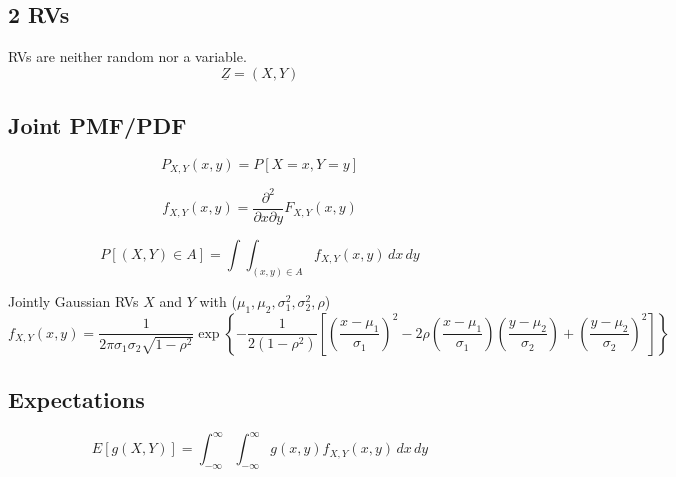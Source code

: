 \begin{faq}

\end{faq}

\subsection{2 RVs}
\begin{notes}
    RVs are neither random nor a variable. 
    \begin{equation*}
        \underline{Z} = (X,Y)
    \end{equation*}
\end{notes}

\subsection{Joint PMF/PDF}
\begin{definition}
    \begin{equation}
    P_{X,Y}(x, y) = P[X = x, Y = y]
    \end{equation}
    
    \begin{equation}
    f_{X,Y}(x, y) = \frac{\partial^2}{\partial x \partial y} F_{X,Y}(x, y)
    \end{equation}
    
    \begin{equation}
    P[(X, Y) \in A] = \int \int_{(x, y) \in A} f_{X,Y}(x, y) \, dx \, dy
    \end{equation}
\end{definition}

\begin{example} Jointly Gaussian RVs $X$ and $Y$ with ($\mu_1, \mu_2, \sigma_1^2, \sigma_2^2, \rho$)
    \[
    f_{X,Y}(x, y) = \frac{1}{2\pi \sigma_1 \sigma_2 \sqrt{1-\rho^2}} 
    \exp \left\{ 
    -\frac{1}{2(1-\rho^2)} 
    \left[ 
    \left(\frac{x-\mu_1}{\sigma_1}\right)^2 
    - 2\rho \left(\frac{x-\mu_1}{\sigma_1}\right) \left(\frac{y-\mu_2}{\sigma_2}\right) 
    + \left(\frac{y-\mu_2}{\sigma_2}\right)^2 
    \right] 
    \right\}
    \]
\end{example}

\subsection{Expectations}
\begin{definition}
    \[
    E[g(X, Y)] = \int_{-\infty}^{\infty} \int_{-\infty}^{\infty} g(x, y) f_{X,Y}(x, y) \, dx \, dy
    \]
\end{definition}

